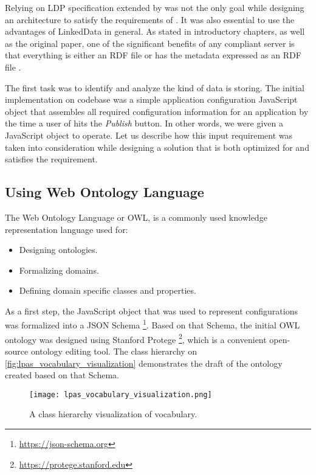 Relying on LDP specification extended by \solid{} was not the only goal while designing an architecture to satisfy the requirements of \lpa{}. It was also essential to use the advantages of LinkedData in general. As stated in introductory chapters, as well as the original paper, one of the significant benefits of any \solid{} compliant server is that everything is either an RDF file or has the metadata expressed as an RDF file \cite{Solid:OriginalPaper}.  

The first task was to identify and analyze the kind of data \lpa{} is storing. The initial implementation on \lpa{} codebase was a simple application configuration JavaScript object that assembles all required configuration information for an application by the time a user of \lpa{} hits the \textit{Publish} button. In other words, we were given a JavaScript object to operate. Let us describe how this input requirement was taken into consideration while designing a solution that is both optimized for \solid{} and satisfies the requirement. 


\subsection{Using Web Ontology Language}
\label{sssec:using_web_ontology_language}

The Web Ontology Language or OWL, is a commonly used knowledge representation language used for:
\begin{itemize}
	\item Designing ontologies.
	\item Formalizing domains.
	\item Defining domain specific classes and properties.
\end{itemize}

As a first step, the JavaScript object that was used to represent \lpa{} configurations was formalized into a JSON Schema \footnote{\url{https://json-schema.org}}. Based on that Schema, the initial OWL ontology was designed using Stanford Protege \footnote{\url{https://protege.stanford.edu}}, which is a convenient open-source ontology editing tool. The class hierarchy on \autoref{fig:lpas_vocabulary_visualization} demonstrates the draft of the ontology created based on that Schema.

\begin{figure}[h]
\centering
\texttt{[image: lpas\_vocabulary\_visualization.png]}
\caption{A class hierarchy visualization of \lpa{} vocabulary.}
\label{fig:lpas_vocabulary_visualization}
\end{figure}

